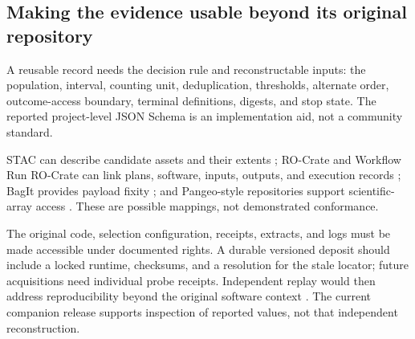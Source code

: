 \subsection{Making the evidence usable beyond its original repository}
A reusable record needs the decision rule and reconstructable inputs: the population, interval, counting unit, deduplication, thresholds, alternate order, outcome-access boundary, terminal definitions, digests, and stop state. The reported project-level JSON Schema is an implementation aid, not a community standard.

STAC can describe candidate assets and their extents \cite{stac2025}; RO-Crate and Workflow Run RO-Crate can link plans, software, inputs, outputs, and execution records \cite{rocrate2022,leo2024}; BagIt provides payload fixity \cite{bagit2018}; and Pangeo-style repositories support scientific-array access \cite{abernathey2021}. These are possible mappings, not demonstrated conformance.

The original code, selection configuration, receipts, extracts, and logs must be made accessible under documented rights. A durable versioned deposit should include a locked runtime, checksums, and a resolution for the stale locator; future acquisitions need individual probe receipts. Independent replay would then address reproducibility beyond the original software context \cite{kedron2022}. The current companion release supports inspection of reported values, not that independent reconstruction.
